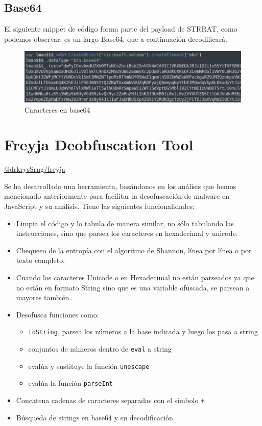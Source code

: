 \documentclass[15pt]{article}
\begin{document}
	\subsection{Base64}
	El siguiente snippet de código forma parte del payload de STRRAT\cite{javascript_malware}, como podemos observar, es un largo Base64, que a continuación decodificará.
	
	\begin{figure}[H]
		\centering
		\includegraphics[width=15cm]{images/base64.png}
		\caption{Caracteres en base64}
	\end{figure}
	
	
	\newpage
	\section{Freyja Deobfuscation Tool}
	\href{https://github.com/drkrysSrng/freyja}{@drkrysSrng/freyja}
	
	Se ha desarrollado una herramienta, basándonos en los análisis que hemos mencionado anteriormente para facilitar la desofuscación de malware en JavaScript y su análisis. Tiene las siguientes funcionalidades:
	
	\begin{itemize}
		\item Limpia el código y lo tabula de manera similar, no sólo tabulando las instrucciones, sino que parsea los caracteres en hexadecimal y unicode.
		\item Chequeeo de la entropía con el algoritmo de Shannon, línea por línea o por texto completo.
		\item Cuando los caracteres Unicode o en Hexadecimal no están parseados ya que no están en formato String sino que es una variable ofuscada, se parsean a mayores también.
		\item Desofusca funciones como:
		\begin{itemize}
			\item \verb*|toString|, parsea los números a la base indicada y luego los pasa a string
			\item conjuntos de números dentro de \verb*|eval| a string
			\item evalúa y sustituye la función \verb*|unescape|
			\item evalúa la función \verb*|parseInt|
		\end{itemize}
		\item Concatena cadenas de caracteres separadas con el símbolo \verb*|+|
		\item Búsqueda de strings en base64 y su decodificación.
	\end{itemize}
	
\end{document}
